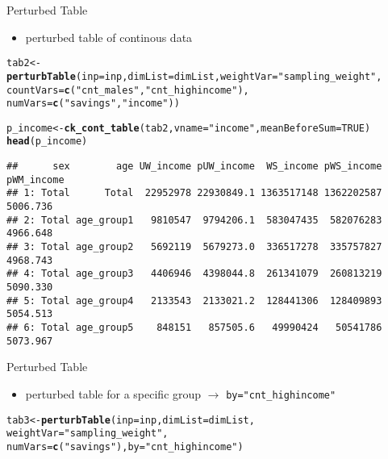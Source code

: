 \documentclass{beamer}\usepackage[]{graphicx}\usepackage[]{color}
\makeatletter
\newcommand{\hlnum}[1]{\textcolor[rgb]{0.686,0.059,0.569}{#1}}%
\newcommand{\hlstr}[1]{\textcolor[rgb]{0.192,0.494,0.8}{#1}}%
\newcommand{\hlstd}[1]{\textcolor[rgb]{0.345,0.345,0.345}{#1}}%
\newcommand{\hlkwb}[1]{\textcolor[rgb]{0.69,0.353,0.396}{#1}}%
\newcommand{\hlkwc}[1]{\textcolor[rgb]{0.333,0.667,0.333}{#1}}%
\newcommand{\hlkwd}[1]{\textcolor[rgb]{0.737,0.353,0.396}{\textbf{#1}}}%
\newenvironment{kframe}{%
 \def\at@end@of@kframe{}%
 \ifinner\ifhmode%
  \def\at@end@of@kframe{\end{minipage}}%
  \begin{minipage}{\columnwidth}%
 \fi\fi%
 \def\FrameCommand##1{\hskip\@totalleftmargin \hskip-\fboxsep
 \colorbox{shadecolor}{##1}\hskip-\fboxsep
     \hskip-\linewidth \hskip-\@totalleftmargin \hskip\columnwidth}%
 \MakeFramed {\advance\hsize-\width
   \@totalleftmargin\z@ \linewidth\hsize
   \@setminipage}}%
 {\par\unskip\endMakeFramed%
 \at@end@of@kframe}
\newenvironment{knitrout}{}{} %
\makeatother
\begin{document}
\begin{frame}[fragile]{Perturbed Table}
\begin{itemize}
  \item perturbed table of continous data
\end{itemize}
\begin{knitrout}\footnotesize
{}\color{fgcolor}\begin{kframe}
\begin{alltt}
\hlstd{tab2} \hlkwb{<-} \hlkwd{perturbTable}\hlstd{(}\hlkwc{inp}\hlstd{=inp,}\hlkwc{dimList}\hlstd{=dimList,}\hlkwc{weightVar}\hlstd{=}\hlstr{"sampling_weight"}\hlstd{,}
  \hlkwc{countVars}\hlstd{=}\hlkwd{c}\hlstd{(}\hlstr{"cnt_males"}\hlstd{,} \hlstr{"cnt_highincome"}\hlstd{),}
  \hlkwc{numVars}\hlstd{=}\hlkwd{c}\hlstd{(}\hlstr{"savings"}\hlstd{,}\hlstr{"income"}\hlstd{))}

\hlstd{p_income} \hlkwb{<-} \hlkwd{ck_cont_table}\hlstd{(tab2,} \hlkwc{vname}\hlstd{=}\hlstr{"income"}\hlstd{,} \hlkwc{meanBeforeSum}\hlstd{=}\hlnum{TRUE}\hlstd{)}
\hlkwd{head}\hlstd{(p_income)}
\end{alltt}
\begin{verbatim}
##      sex        age UW_income pUW_income  WS_income pWS_income pWM_income
## 1: Total      Total  22952978 22930849.1 1363517148 1362202587   5006.736
## 2: Total age_group1   9810547  9794206.1  583047435  582076283   4966.648
## 3: Total age_group2   5692119  5679273.0  336517278  335757827   4968.743
## 4: Total age_group3   4406946  4398044.8  261341079  260813219   5090.330
## 5: Total age_group4   2133543  2133021.2  128441306  128409893   5054.513
## 6: Total age_group5    848151   857505.6   49990424   50541786   5073.967
\end{verbatim}
\end{kframe}
\end{knitrout}
\end{frame}

\begin{frame}[fragile]{Perturbed Table}
\begin{itemize}
  \item perturbed table for a specific group $\rightarrow$ \texttt{by="cnt\_highincome"}
\end{itemize}
\begin{knitrout}\footnotesize
{}\color{fgcolor}\begin{kframe}
\begin{alltt}
\hlstd{tab3} \hlkwb{<-} \hlkwd{perturbTable}\hlstd{(}\hlkwc{inp}\hlstd{=inp,} \hlkwc{dimList}\hlstd{=dimList,}
  \hlkwc{weightVar}\hlstd{=}\hlstr{"sampling_weight"}\hlstd{,}
  \hlkwc{numVars}\hlstd{=}\hlkwd{c}\hlstd{(}\hlstr{"savings"}\hlstd{),} \hlkwc{by}\hlstd{=}\hlstr{"cnt_highincome"}\hlstd{)}
\end{alltt}
\end{kframe}
\end{knitrout}
\end{frame}
\end{document}
